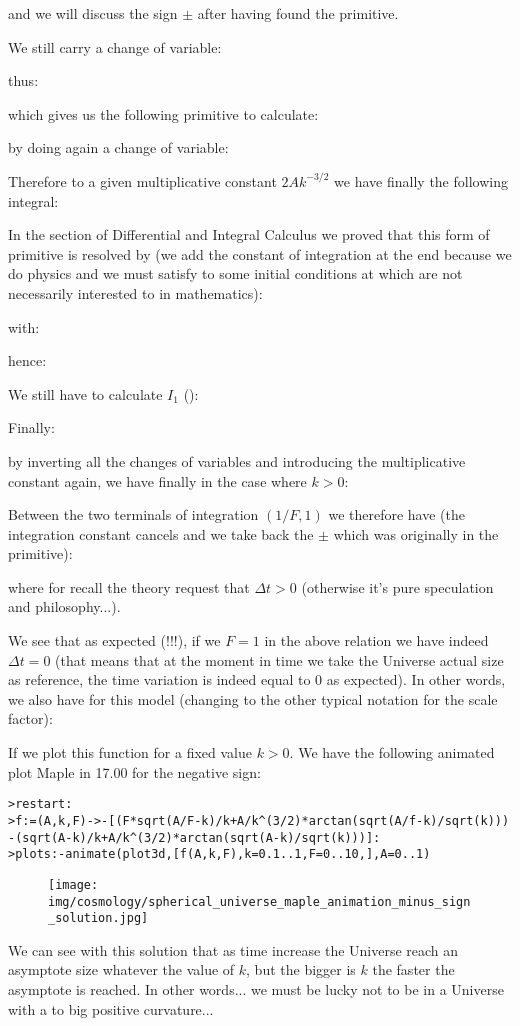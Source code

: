 	and we will discuss the sign $\pm$ after having found the primitive.

	We still carry a change of variable:
	
	thus:
	
 	which gives us the following primitive to calculate:
	
	by doing again a change of variable:
	
	Therefore to a given multiplicative constant $2Ak^{-3/2}$ we have finally the following integral:
	
	In the section of Differential and Integral Calculus we proved that this form of primitive is resolved by (we add the constant of integration at the end because we do physics and we must satisfy to some initial conditions at which are not necessarily interested to in mathematics):
	
	with:
	
	hence:
	
	We still have to calculate $I_1$ ():
	
	Finally:
	
	by inverting all the changes of variables and introducing the multiplicative constant again, we have finally in the case where $k>0$:
	
	Between the two terminals of integration $(1/F,1)$ we therefore have (the integration constant cancels and we take back the $\pm$ which was originally in the primitive):
	
	where for recall the theory request that $\Delta t>0$ (otherwise it's pure speculation and philosophy...).
	
	We see that as expected (!!!), if we $F=1$ in the above relation we have indeed $\Delta t=0$ (that means that at the moment in time we take the Universe actual size as reference, the time variation is indeed equal to $0$ as expected). In other words, we also have for this model (changing to the other typical notation for the scale factor):
	
	If we plot this function for a fixed value $k>0$. We have the following  animated plot Maple in 17.00 for the negative sign:
	
	\texttt{>restart:\\
	>f:=(A,k,F)->-[(F*sqrt(A/F-k)/k+A/k\string^(3/2)*arctan(sqrt(A/f-k)/sqrt(k)))\\
	-(sqrt(A-k)/k+A/k\string^(3/2)*arctan(sqrt(A-k)/sqrt(k)))]:\\
	>plots:-animate(plot3d,[f(A,k,F),k=0.1..1,F=0..10,],A=0..1)
	}
	\begin{figure}[H]
		\centering
		\texttt{[image: img/cosmology/spherical\_universe\_maple\_animation\_minus\_sign\_solution.jpg]}
	\end{figure}
	We can see with this solution that as time increase the Universe reach an asymptote size whatever the value of $k$, but the bigger is $k$ the faster the asymptote is reached. In other words... we must be lucky not to be in a Universe with a to big positive curvature...
	
